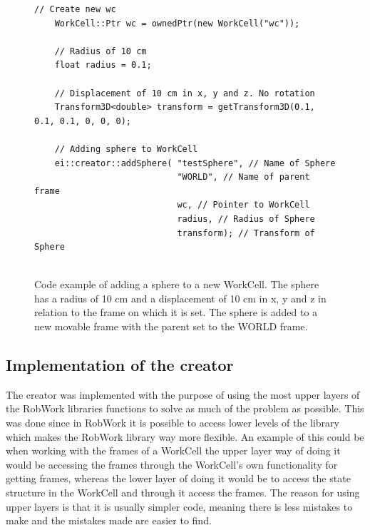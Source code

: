 \begin{figure}[h]
	\centering
	\lstset{language=C++} 
	\begin{lstlisting}[frame=single]
	// Create new wc
	WorkCell::Ptr wc = ownedPtr(new WorkCell("wc"));
	 
	// Radius of 10 cm
	float radius = 0.1;
	
	// Displacement of 10 cm in x, y and z. No rotation
	Transform3D<double> transform = getTransform3D(0.1, 0.1, 0.1, 0, 0, 0); 
	
	// Adding sphere to WorkCell
	ei::creator::addSphere( "testSphere", // Name of Sphere
							"WORLD", // Name of parent frame
							wc, // Pointer to WorkCell
							radius, // Radius of Sphere
							transform); // Transform of Sphere
	 
	\end{lstlisting}
	\caption{Code example of adding a sphere to a new WorkCell. The sphere has a radius of 10 cm and a displacement of 10 cm in x, y and z in relation to the frame on which it is set. The sphere is added to a new movable frame with the parent set to the WORLD frame.}
	\label{fig:CodeExampleAddSphere}
\end{figure}

\subsection{Implementation of the creator}
The creator was implemented with the purpose of using the most upper layers of the RobWork libraries functions to solve as much of the problem as possible. This was done since in RobWork it is possible to access lower levels of the library which makes the RobWork library way more flexible. An example of this could be when working with the frames of a WorkCell the upper layer way of doing it would be accessing the frames through the WorkCell's own functionality for getting frames, whereas the lower layer of doing it would be to access the state structure in the WorkCell and through it access the frames. The reason for using upper layers is that it is usually simpler code, meaning there is less mistakes to make and the mistakes made are easier to find.\\

